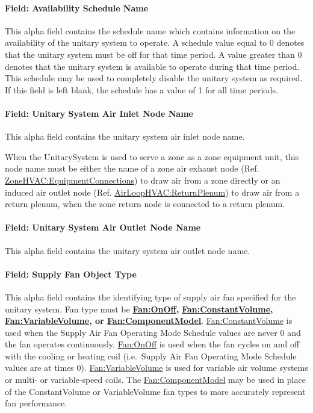 \paragraph{Field: Availability Schedule Name}\label{field-availability-schedule-name-017}

This alpha field contains the schedule name which contains information on the availability of the unitary system to operate. A schedule value equal to 0 denotes that the unitary system must be off for that time period. A value greater than 0 denotes that the unitary system is available to operate during that time period. This schedule may be used to completely disable the unitary system as required. If this field is left blank, the schedule has a value of 1 for all time periods.

\paragraph{Field: Unitary System Air Inlet Node Name}\label{field-unitary-system-air-inlet-node-name}

This alpha field contains the unitary system air inlet node name.

When the UnitarySystem is used to serve a zone as a zone equipment unit, this node name must be either the name of a zone air exhaust node (Ref. \hyperref[zonehvacequipmentconnections]{ZoneHVAC:EquipmentConnections}) to draw air from a zone directly or an induced air outlet node (Ref. \hyperref[airloophvacreturnplenum]{AirLoopHVAC:ReturnPlenum}) to draw air from a return plenum, when the zone return node is connected to a return plenum.

\paragraph{Field: Unitary System Air Outlet Node Name}\label{field-unitary-system-air-outlet-node-name}

This alpha field contains the unitary system air outlet node name.

\paragraph{Field: Supply Fan Object Type}\label{field-supply-fan-object-type-000}

This alpha field contains the identifying type of supply air fan specified for the unitary system. Fan type must be \textbf{\hyperref[fanonoff]{Fan:OnOff},} \textbf{\hyperref[fanconstantvolume]{Fan:ConstantVolume}, \hyperref[fanvariablevolume]{Fan:VariableVolume}, or \hyperref[fancomponentmodel]{Fan:ComponentModel}}. \hyperref[fanconstantvolume]{Fan:ConstantVolume} is used when the Supply Air Fan Operating Mode Schedule values are never 0 and the fan operates continuously. \hyperref[fanonoff]{Fan:OnOff} is used when the fan cycles on and off with the cooling or heating coil (i.e.~Supply Air Fan Operating Mode Schedule values are at times 0). \hyperref[fanvariablevolume]{Fan:VariableVolume} is used for variable air volume systems or multi- or variable-speed coils. The \hyperref[fancomponentmodel]{Fan:ComponentModel} may be used in place of the ConstantVolume or VariableVolume fan types to more accurately represent fan performance.

